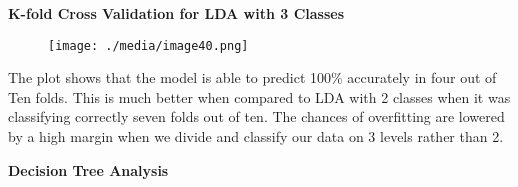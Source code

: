 \documentclass[12pt]{article}
\begin{document}
\vspace{\baselineskip}
\begin{adjustwidth}{1.0in}{0.0in}
\begin{justify}
\textbf{K-fold Cross Validation for LDA with 3 Classes}
\end{justify}\par

\end{adjustwidth}


\vspace{\baselineskip}



\begin{figure}[H]
	\begin{Center}
		\texttt{[image: ./media/image40.png]}
	\end{Center}
\end{figure}



\par


\vspace{\baselineskip}
\begin{justify}
The plot shows that the model is able to predict 100$\%$  accurately in four out of Ten folds. This is much better when compared to LDA with 2 classes when it was classifying correctly seven folds out of ten. The chances of overfitting are lowered by a high margin when we divide and classify our data on 3 levels rather than 2. 
\end{justify}\par


\vspace{\baselineskip}

\vspace{\baselineskip}

\vspace{\baselineskip}

\vspace{\baselineskip}

\vspace{\baselineskip}

\vspace{\baselineskip}
\begin{Center}
\textbf{Decision Tree Analysis}
\end{Center}\par
\end{document}
